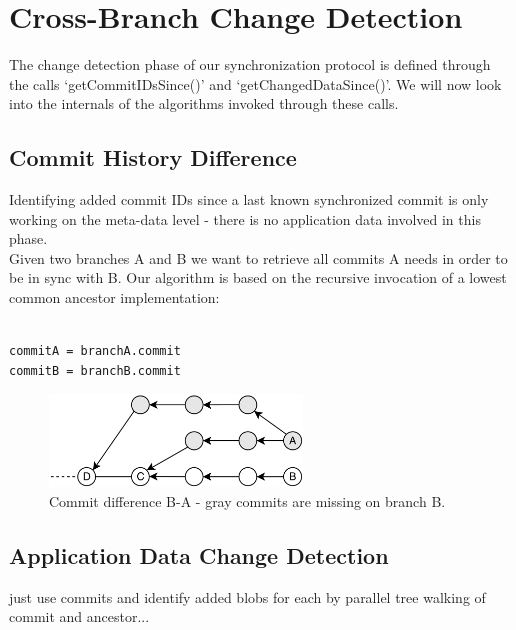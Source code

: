 
\section{Cross-Branch Change Detection}
\label{main.diff-across-commits}

The change detection phase of our synchronization protocol is defined through the calls `getCommitIDsSince()' and `getChangedDataSince()'.
We will now look into the internals of the algorithms invoked through these calls.\\

\subsection{Commit History Difference}
Identifying added commit IDs since a last known synchronized commit is only working on the meta-data level - there is no application data involved in this phase.\\
Given two branches A and B we want to retrieve all commits A needs in order to be in sync with B.
Our algorithm is based on the recursive invocation of a lowest common ancestor implementation:\\

\begin{lstlisting}[caption=Detecting commit history difference, label=commit-difference]

commitA = branchA.commit
commitB = branchB.commit

\end{lstlisting}

\begin{figure}[new-commits]
  \centering
  \includegraphics[width=0.6\textwidth]{img/new-commits}
  \caption{Commit difference B-A - gray commits are missing on branch B.}
  \label{fig:histo.new-commits}
\end{figure}

\subsection{Application Data Change Detection}

just use commits and identify added blobs for each by parallel tree walking of commit and ancestor...